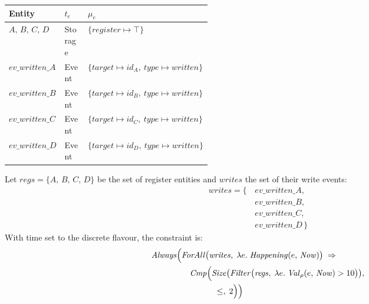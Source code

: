 {\footnotesize
    \begin{center}
        \begin{tabular}{@{}l l p{0.40\linewidth}@{}}
            \toprule
            \textbf{Entity}           & $t_e$   & $\mu_e$                               \\
            \midrule
            $A,\, B,\, C,\, D$        & Storage & $\{\mathit{register} \mapsto \top\}$  \\
            $\mathit{ev\_written\_A}$ & Event   &
            $\{\mathit{target} \mapsto id_A,\ \mathit{type} \mapsto \mathit{written}\}$ \\
            $\mathit{ev\_written\_B}$ & Event   &
            $\{\mathit{target} \mapsto id_B,\ \mathit{type} \mapsto \mathit{written}\}$ \\
            $\mathit{ev\_written\_C}$ & Event   &
            $\{\mathit{target} \mapsto id_C,\ \mathit{type} \mapsto \mathit{written}\}$ \\
            $\mathit{ev\_written\_D}$ & Event   &
            $\{\mathit{target} \mapsto id_D,\ \mathit{type} \mapsto \mathit{written}\}$ \\
            \bottomrule
        \end{tabular}
    \end{center}
}

Let $\mathit{regs} = \{A,\, B,\, C,\, D\}$ be the set of register entities and $\mathit{writes}$ the set of their write events:
{\footnotesize
\begin{align*}
    \mathit{writes} = \{\,
     & \mathit{ev\_written\_A},     \\
     & \mathit{ev\_written\_B},     \\
     & \mathit{ev\_written\_C},     \\
     & \mathit{ev\_written\_D} \,\}
\end{align*}
}
With time set to the discrete flavour, the constraint is:
{\footnotesize
\begin{align*}
    \mathit{Always}\Bigl(
     & \mathit{ForAll}\bigl(\mathit{writes},\; \lambda e.\; \mathit{Happening}(e,\, \mathit{Now})\bigr) \;\Rightarrow{}          \\
     & \quad \mathit{Cmp}\Bigl(
    \mathit{Size}\bigl(\mathit{Filter}\bigl(\mathit{regs},\; \lambda e.\; \mathit{Val}_\rho(e,\, \mathit{Now}) > 10\bigr)\bigr), \\
     & \qquad\qquad \leq,\; 2 \Bigr)
    \Bigr)
\end{align*}
}

